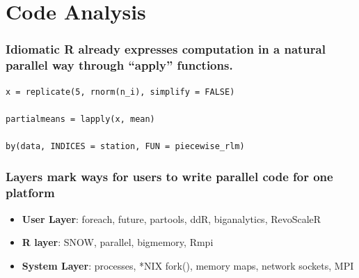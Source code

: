 \documentclass{beamer}
\begin{document}
\section{Code Analysis}
\begin{frame}[fragile]

    \frametitle{Idiomatic R already expresses computation in a natural
    parallel way through ``apply'' functions.}

\begin{verbatim}
x = replicate(5, rnorm(n_i), simplify = FALSE)

partialmeans = lapply(x, mean)

by(data, INDICES = station, FUN = piecewise_rlm)
\end{verbatim}


\end{frame}
\begin{frame}

    \frametitle{Layers mark ways for users to write parallel code for one
    platform}

\begin{itemize}
    \item \textbf{User Layer}: foreach, future, partools, ddR, biganalytics, RevoScaleR
    \item \textbf{R layer}: SNOW, parallel, bigmemory, Rmpi
    \item \textbf{System Layer}: processes, *NIX fork(), memory maps, network sockets,
    MPI
\end{itemize}

\end{frame}
\end{document}
